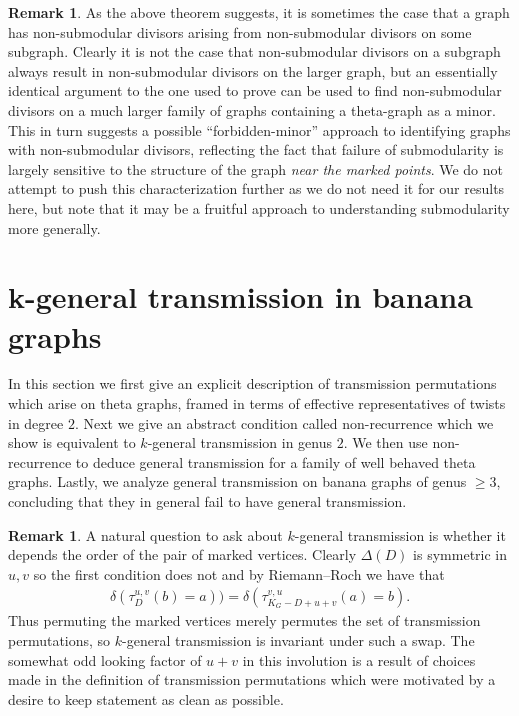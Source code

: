 \documentclass[11pt]{article}
\theoremstyle{definition}
\newtheorem{rema}[theo]{Remark}
\numberwithin{equation}{section}
\begin{document}
\begin{rema}
    As the above theorem suggests, it is sometimes the case that a graph has non-submodular divisors arising from non-submodular divisors on some subgraph. Clearly it is not the case that non-submodular divisors on a subgraph always result in non-submodular divisors on the larger graph, but an essentially identical argument to the one used to prove  can be used to find non-submodular divisors on a much larger family of graphs containing a theta-graph as a minor. This in turn suggests a possible ``forbidden-minor'' approach to identifying graphs with non-submodular divisors, reflecting the fact that failure of submodularity is largely sensitive to the structure of the graph \textit{near the marked points}. We do not attempt to push this characterization further as we do not need it for our results here, but note that it may be a fruitful approach to understanding submodularity more generally.
\end{rema}

\section{k-general transmission in banana graphs}\label{sec:kgt}

In this section we first give an explicit description of transmission permutations which arise on theta graphs, framed in terms of effective representatives of twists in degree $2$. Next we give an abstract condition called non-recurrence which we show is equivalent to $k$-general transmission in genus $2$. We then use non-recurrence to deduce general transmission for a family of well behaved theta graphs. Lastly, we analyze general transmission on banana graphs of genus $\geq 3$, concluding that they in general fail to have general transmission.

\begin{rema}\label{rem-PermInvol}
    A natural question to ask about $k$-general transmission is whether it depends the order of the pair of marked vertices. Clearly $\Delta(D)$ is symmetric in $u,v$ so the first condition does not and by Riemann--Roch we have that
    \begin{align*}
        \delta(\tau_D^{u,v}(b) = a)) = \delta(\tau_{K_G-D+u+v}^{v,u}(a) = b).
    \end{align*}
    Thus permuting the marked vertices merely permutes the set of transmission permutations, so $k$-general transmission is invariant under such a swap. The somewhat odd looking factor of $u+v$ in this involution is a result of choices made in the definition of transmission permutations which were motivated by a desire to keep statement \cite[Theorem 3.11]{Pfl22} as clean as possible. 
\end{rema}
\end{document}
